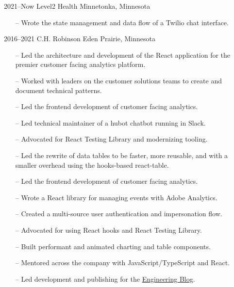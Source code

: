 \documentclass[]{cv-style} %
\begin{document}
\begin{entrylist}


\entry
{2021--Now}
{Level2 Health}
{Minnetonka, Minnesota}
{
\begin{itemize}
    \item[--] Wrote the state management and data flow of a Twilio chat interface.
\end{itemize}}

\entry
{2016--2021}
{C.H. Robinson}
{Eden Prairie, Minnesota}
{
\begin{itemize}
    \item[--] Led the architecture and development of the React application for the premier customer facing analytics platform.
    \item[--] Worked with leaders on the customer solutions teams to create and document technical patterns.
\end{itemize}

\begin{itemize}
    \item[--] Led the frontend development of customer facing analytics.
    \item[--] Led technical maintainer of a hubot chatbot running in Slack.
    \item[--] Advocated for React Testing Library and modernizing tooling.
    \item[--] Led the rewrite of data tables to be faster, more reusable, and with a smaller overhead using the hooks-based react-table.
\end{itemize}

\begin{itemize}
    \item[--] Led the frontend development of customer facing analytics.
    \item[--] Wrote a React library for managing events with Adobe Analytics.
    \item[--] Created a multi-source user authentication and impersonation flow.
    \item[--] Advocated for using React hooks and React Testing Library.
    \item[--] Built performant and animated charting and table components.
    \item[--] Mentored across the company with JavaScript/TypeScript and React.
    \item[--] Led development and publishing for the \href{https://engineering.chrobinson.com}{Engineering Blog}.
\end{itemize}

}
\end{entrylist}
\end{document}
